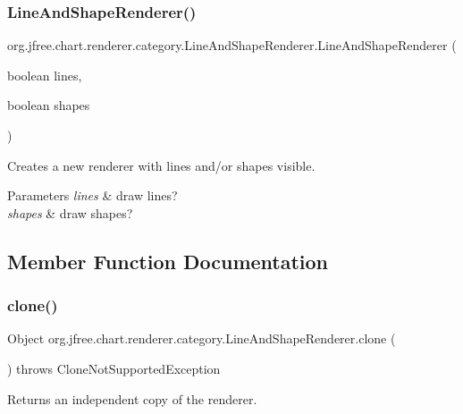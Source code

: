 \subsubsection{\texorpdfstring{Line\+And\+Shape\+Renderer()}{LineAndShapeRenderer()}\hspace{0.1cm}{\footnotesize\ttfamily [2/2]}}
{\footnotesize\ttfamily org.\+jfree.\+chart.\+renderer.\+category.\+Line\+And\+Shape\+Renderer.\+Line\+And\+Shape\+Renderer (\begin{DoxyParamCaption}\item[{boolean}]{lines,  }\item[{boolean}]{shapes }\end{DoxyParamCaption})}

Creates a new renderer with lines and/or shapes visible.


\begin{DoxyParams}{Parameters}
{\em lines} & draw lines? \\
\hline
{\em shapes} & draw shapes? \\
\hline
\end{DoxyParams}


\subsection{Member Function Documentation}
\mbox{\label{classorg_1_1jfree_1_1chart_1_1renderer_1_1category_1_1_line_and_shape_renderer_a19e4cfbd902580d20d14b6df22cdb21a}} 
\subsubsection{\texorpdfstring{clone()}{clone()}}
{\footnotesize\ttfamily Object org.\+jfree.\+chart.\+renderer.\+category.\+Line\+And\+Shape\+Renderer.\+clone (\begin{DoxyParamCaption}{ }\end{DoxyParamCaption}) throws Clone\+Not\+Supported\+Exception}

Returns an independent copy of the renderer.

